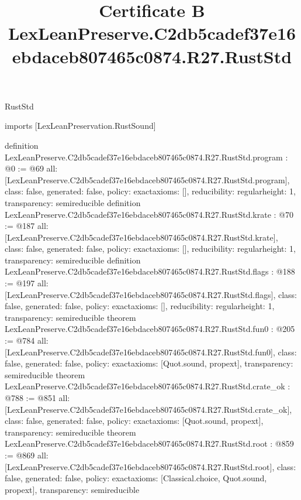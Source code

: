 \begin{lexlean}{RustStd}
\title{Certificate B LexLeanPreserve.C2db5cadef37e16ebdaceb807465c0874.R27.RustStd}
\begin{coremodule}
imports [LexLeanPreservation.RustSound]

definition LexLeanPreserve.C2db5cadef37e16ebdaceb807465c0874.R27.RustStd.program : @0 := @69 {
  all: [LexLeanPreserve.C2db5cadef37e16ebdaceb807465c0874.R27.RustStd.program],
  class: false,
  generated: false,
  policy: exact{axioms: []},
  reducibility: regular{height: 1},
  transparency: semireducible
}
definition LexLeanPreserve.C2db5cadef37e16ebdaceb807465c0874.R27.RustStd.krate : @70 := @187 {
  all: [LexLeanPreserve.C2db5cadef37e16ebdaceb807465c0874.R27.RustStd.krate],
  class: false,
  generated: false,
  policy: exact{axioms: []},
  reducibility: regular{height: 1},
  transparency: semireducible
}
definition LexLeanPreserve.C2db5cadef37e16ebdaceb807465c0874.R27.RustStd.flags : @188 := @197 {
  all: [LexLeanPreserve.C2db5cadef37e16ebdaceb807465c0874.R27.RustStd.flags],
  class: false,
  generated: false,
  policy: exact{axioms: []},
  reducibility: regular{height: 1},
  transparency: semireducible
}
theorem LexLeanPreserve.C2db5cadef37e16ebdaceb807465c0874.R27.RustStd.fun0 : @205 := @784 {
  all: [LexLeanPreserve.C2db5cadef37e16ebdaceb807465c0874.R27.RustStd.fun0],
  class: false,
  generated: false,
  policy: exact{axioms: [Quot.sound, propext]},
  transparency: semireducible
}
theorem LexLeanPreserve.C2db5cadef37e16ebdaceb807465c0874.R27.RustStd.crate_ok : @788 := @851 {
  all: [LexLeanPreserve.C2db5cadef37e16ebdaceb807465c0874.R27.RustStd.crate_ok],
  class: false,
  generated: false,
  policy: exact{axioms: [Quot.sound, propext]},
  transparency: semireducible
}
theorem LexLeanPreserve.C2db5cadef37e16ebdaceb807465c0874.R27.RustStd.root : @859 := @869 {
  all: [LexLeanPreserve.C2db5cadef37e16ebdaceb807465c0874.R27.RustStd.root],
  class: false,
  generated: false,
  policy: exact{axioms: [Classical.choice, Quot.sound, propext]},
  transparency: semireducible
}


\end{coremodule}
\end{lexlean}
